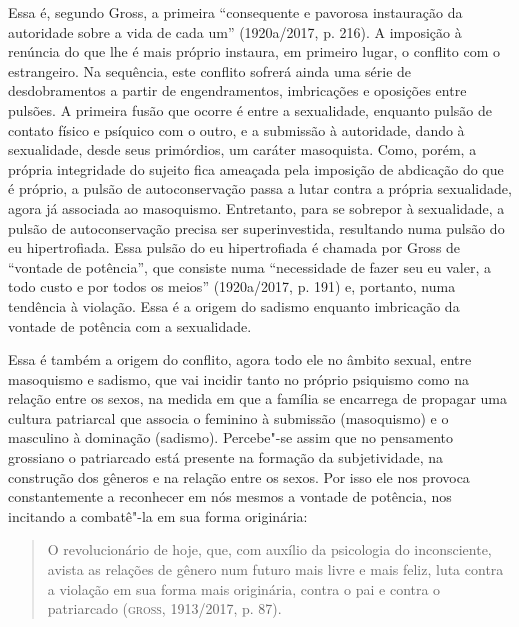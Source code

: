 Essa é, segundo Gross, a primeira ``consequente e pavorosa instauração
da autoridade sobre a vida de cada um'' (1920a/2017, p. 216). A imposição à renúncia do que
lhe é mais próprio instaura, em primeiro lugar, o conflito com o
estrangeiro. Na sequência, este conflito sofrerá ainda uma série de
desdobramentos a partir de engendramentos, imbricações e oposições entre
pulsões. A primeira fusão que ocorre é entre a sexualidade, enquanto
pulsão de contato físico e psíquico com o outro, e a submissão à
autoridade, dando à sexualidade, desde seus primórdios, um caráter
masoquista. Como, porém, a própria integridade do sujeito fica ameaçada
pela imposição de abdicação do que é próprio, a pulsão de
autoconservação passa a lutar contra a própria sexualidade, agora já
associada ao masoquismo. Entretanto, para se sobrepor à sexualidade, a
pulsão de autoconservação precisa ser superinvestida, resultando numa
pulsão do eu hipertrofiada. Essa pulsão do eu hipertrofiada é chamada
por Gross de ``vontade de potência'', que consiste numa ``necessidade de
fazer seu eu valer, a todo custo e por todos os meios'' (1920a/2017, p. 191) e, portanto,
numa tendência à violação. Essa é a origem do sadismo enquanto
imbricação da vontade de potência com a sexualidade.

Essa é também a origem do conflito, agora todo ele no âmbito sexual,
entre masoquismo e sadismo, que vai incidir tanto no próprio psiquismo
como na relação entre os sexos, na medida em que a família se encarrega
de propagar uma cultura patriarcal que associa o feminino à submissão
(masoquismo) e o masculino à dominação (sadismo). Percebe"-se assim que
no pensamento grossiano o patriarcado está presente na formação da
subjetividade, na construção dos gêneros e na relação entre os sexos.
Por isso ele nos provoca constantemente a reconhecer em nós mesmos a
vontade de potência, nos incitando a combatê"-la em sua forma originária:

\begin{quote}
O revolucionário de hoje, que, com auxílio da psicologia do
inconsciente, avista as relações de gênero num futuro mais livre e mais
feliz, luta contra a violação em sua forma mais originária, contra o pai
e contra o patriarcado (\textsc{gross}, 1913/2017, p. 87).
\end{quote}

